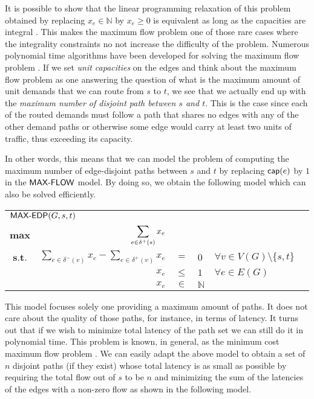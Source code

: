 It is possible to show that the linear programming relaxation of this problem obtained by replacing $x_e \in \mathbb{N}$ by $x_e \geq 0$ 
is equivalent as long as the capacities are integral \cite{Ahuja}. This makes the maximum flow problem one of those rare cases where the integrality constraints no not increase the difficulty
of the problem. Numerous polynomial time algorithms have been developed for solving the maximum flow problem \cite{Edmonds:1972:TIA:321694.321699, dinitz, Goldberg:1988:NAM:48014.61051, Ahuja}.
If we set \emph{unit capacities} on the edges and think about the maximum flow problem as one answering the question of what is the maximum amount of unit demands that we can
route from $s$ to $t$, we see that we actually end up with the \emph{maximum number of disjoint path between $s$ and $t$}. This is the case
since each of the routed demands must follow a path that shares no edges with any of the other demand paths or otherwise some edge would carry at least two units
of traffic, thus exceeding its capacity.

In other words, this means that we can model the problem of computing the maximum number of edge-disjoint paths between $s$ and $t$ by replacing $\mathsf{cap}(e)$
by $1$ in the $\textsf{MAX-FLOW}$ model. By doing so, we obtain the following model which can also be solved efficiently.

\begin{center}
\begin{tabular}{crcllr}
\multicolumn{5}{l}{$\textsf{MAX-EDP}(G, s, t)$} \\[0.5cm] 
$\displaystyle \mathbf{max}$ & $\displaystyle \sum_{e \in \delta^+(s)} x_e$ & & & & \\[0.5cm]
$\textbf{s.t.}$ & $\displaystyle \sum_{e \in \delta^-(v)} x_{e} - \sum_{e \in \delta^+(v)} x_{e}$ & $=$    & $ 0$ & $\forall v \in V(G) \setminus \{ s, t \}$  &  \\[0.5cm]
                & $x_{e}$ & $\leq$ & $1$ & $\forall e \in E(G)$ & \\[0.5cm]
                & $x_{e}$ & $\in$ & $\mathbb{N}$
\end{tabular}
\end{center}

This model focuses solely one providing a maximum amount of paths. It does not care about the quality of those paths, for instance, in terms of latency. It turns out that if we wish to
minimize total latency of the path set we can still do it in polynomial time. This problem is known, in general, as the minimum cost maximum flow problem \cite{Ahuja}.
We can easily adapt the above model to obtain a set of $n$ disjoint paths (if they exist) whose total latency is as small as possible by
requiring the total flow out of $s$ to be $n$ and minimizing the sum of the latencies of the edges with a non-zero flow as shown in the following model.

